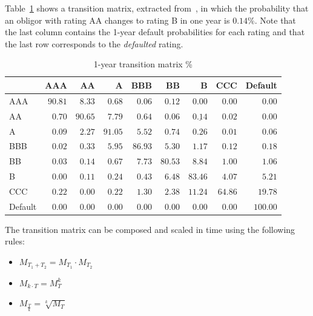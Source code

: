 \documentclass[11pt,fleqn]{book} %
\begin{document}
\begin{example}
	\label{ex:1ytm}
	Table~\ref{tmatrix1} shows a transition matrix, extracted 
	from~\cite[p. 20]{cmetrics:1997}, in which the probability that an obligor 
	with rating AA changes to rating B in one year is $0.14\%$. Note that the
	last column contains the 1-year default probabilities for each rating and 
	that the last row corresponds to the \emph{defaulted} rating.
\end{example}

\begin{table}[!ht]
	\begin{center}
		\begin{tabular}[]{l|rrrrrrrr}
							& AAA     & AA      & A       & BBB     & BB      & B                  & CCC     & Default  \\
			\hline
			AAA     & $90.81$ & $8.33$  & $0.68$  & $0.06$  & $0.12$  & $0.00$             & $0.00$  & $0.00$   \\
			AA      & $0.70$  & $90.65$ & $7.79$  & $0.64$  & $0.06$  & $\underline{0.14}$ & $0.02$  & $0.00$   \\
			A       & $0.09$  & $2.27$  & $91.05$ & $5.52$  & $0.74$  & $0.26$             & $0.01$  & $0.06$   \\
			BBB     & $0.02$  & $0.33$  & $5.95$  & $86.93$ & $5.30$  & $1.17$             & $0.12$  & $0.18$   \\
			BB      & $0.03$  & $0.14$  & $0.67$  & $7.73$  & $80.53$ & $8.84$             & $1.00$  & $1.06$   \\
			B       & $0.00$  & $0.11$  & $0.24$  & $0.43$  & $6.48$  & $83.46$            & $4.07$  & $5.21$   \\
			CCC     & $0.22$  & $0.00$  & $0.22$  & $1.30$  & $2.38$  & $11.24$            & $64.86$ & $19.78$  \\
			Default & $0.00$  & $0.00$  & $0.00$  & $0.00$  & $0.00$  & $0.00$             & $0.00$  & $100.00$ \\
		\end{tabular}
		\caption{1-year transition matrix \%}
		\label{tmatrix1}
	\end{center}
\end{table}

\begin{proposition}
	The transition matrix can be composed and scaled in time using the 
	following rules:
	\begin{itemize}
		\item $M_{T_1+T_2} = M_{T_1} \cdot M_{T_2}$
		\item $M_{k \cdot T} = M_{T}^k$
		\item $M_{\frac{T}{k}} = \sqrt[k]{M_{T}}$
	\end{itemize}
\end{proposition}
\end{document}
